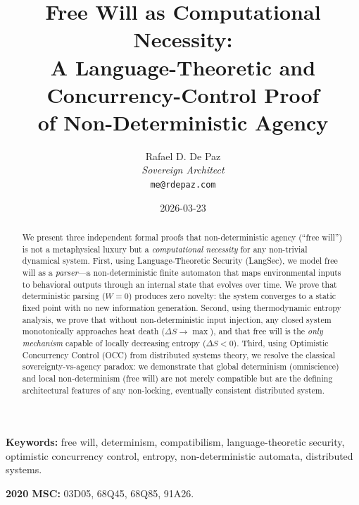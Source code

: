 \documentclass[12pt, a4paper]{article}
\theoremstyle{plain}
\theoremstyle{definition}
\begin{document}
\title{\textbf{
  Free Will as Computational Necessity: \\
  A Language-Theoretic and Concurrency-Control Proof \\
  of Non-Deterministic Agency}}
\author{Rafael D. De Paz \\ \textit{Sovereign Architect} \\ \texttt{me@rdepaz.com}}
\date{2026-03-23}
\maketitle

\begin{abstract}
We present three independent formal proofs that non-deterministic agency
(``free will'') is not a metaphysical luxury but a \emph{computational
necessity} for any non-trivial dynamical system. First, using
Language-Theoretic Security (LangSec), we model free will as a
\emph{parser}---a non-deterministic finite automaton that maps environmental
inputs to behavioral outputs through an internal state that evolves over time.
We prove that deterministic parsing ($W = 0$) produces zero novelty: the system
converges to a static fixed point with no new information generation. Second,
using thermodynamic entropy analysis, we prove that without non-deterministic
input injection, any closed system monotonically approaches heat death
($\Delta S \to \max$), and that free will is the \emph{only mechanism} capable
of locally decreasing entropy ($\Delta S < 0$). Third, using Optimistic
Concurrency Control (OCC) from distributed systems theory, we resolve the
classical sovereignty-vs-agency paradox: we demonstrate that global
determinism (omniscience) and local non-determinism (free will) are not merely
compatible but are the defining architectural features of any non-locking,
eventually consistent distributed system.
\end{abstract}

\vspace{1em}
\noindent\textbf{Keywords:} free will, determinism, compatibilism,
language-theoretic security, optimistic concurrency control, entropy,
non-deterministic automata, distributed systems.

\vspace{0.5em}
\noindent\textbf{2020 MSC:} 03D05, 68Q45, 68Q85, 91A26.

\end{document}
